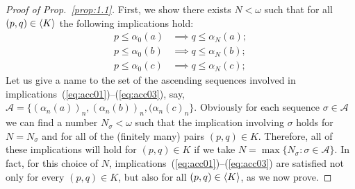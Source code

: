 \begin{proof}[Proof of Prop.~\ref{prop:1.1}]
First, we show there exists $N < \omega$ such that 
for all $(p, q) \in \langle K\rangle$ 
the following implications hold:
\begin{align}
  p \leq \alpha_0(a) &\implies q \leq \alpha_N(a); \label{eq:acc01}\\
  p \leq \alpha_0(b) &\implies q \leq \alpha_N(b); \label{eq:acc02}\\ 
  p \leq \alpha_0(c) &\implies q \leq \alpha_N(c); \label{eq:acc03}
\end{align}
Let us give a name to the set of the ascending 
sequences involved in implications~(\ref{eq:acc01})--(\ref{eq:acc03}), say, 
$\mathcal A = \{(\alpha_n(a))_n, (\alpha_n(b))_n, (\alpha_n(c)_n\}$.
Obviously for each sequence $\sigma \in \mathcal A$
we can find a number $N_\sigma < \omega$ such that the implication involving $\sigma$
holds for $N = N_\sigma$ and for all of the (finitely many) pairs $(p,q) \in K$.  
Therefore, all of these implications will hold for $(p, q) \in K$ if we take 
$N = \max \{N_{\sigma} : \sigma \in \mathcal A\}$. %
In fact, for this choice of $N$, implications~(\ref{eq:acc01})--(\ref{eq:acc03}) 
are satisfied not only for every $(p, q) \in K$, but also for all $(p, q) \in \langle K\rangle$,
as we now prove.

    

\end{proof}
